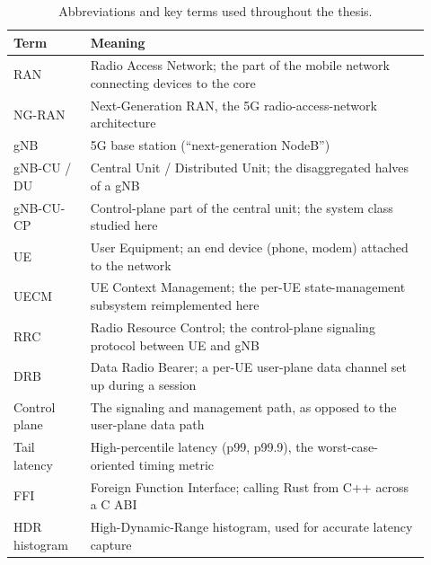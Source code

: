\documentclass[english,twoside,openright,a4paper,censored,csm,software-track-2020]{HYthesisML}
\begin{document}
\begin{table}
\centering
\caption{Abbreviations and key terms used throughout the thesis.\label{tab:abbrev}}
\renewcommand{\arraystretch}{1.2}
\begin{tabular}{@{}p{0.17\linewidth} p{0.75\linewidth}@{}}
\hline\hline
Term & Meaning \\
\hline
RAN & Radio Access Network; the part of the mobile network connecting devices to the core \\
NG-RAN & Next-Generation RAN, the 5G radio-access-network architecture \\
gNB & 5G base station (``next-generation NodeB'') \\
gNB-CU / DU & Central Unit / Distributed Unit; the disaggregated halves of a gNB \\
gNB-CU-CP & Control-plane part of the central unit; the system class studied here \\
UE & User Equipment; an end device (phone, modem) attached to the network \\
UECM & UE Context Management; the per-UE state-management subsystem reimplemented here \\
RRC & Radio Resource Control; the control-plane signaling protocol between UE and gNB \\
DRB & Data Radio Bearer; a per-UE user-plane data channel set up during a session \\
Control plane & The signaling and management path, as opposed to the user-plane data path \\
Tail latency & High-percentile latency (p99, p99.9), the worst-case-oriented timing metric \\
FFI & Foreign Function Interface; calling Rust from C++ across a C ABI \\
HDR histogram & High-Dynamic-Range histogram, used for accurate latency capture \\
\hline
\end{tabular}
\end{table}
\end{document}
